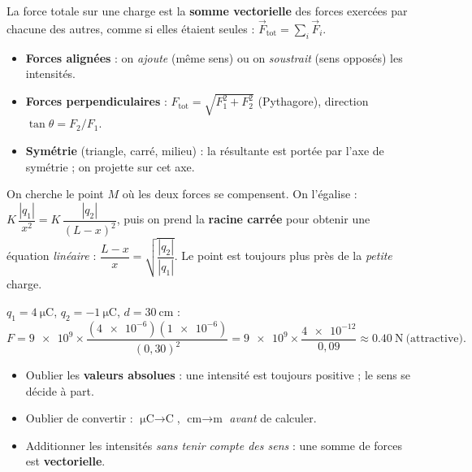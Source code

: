 \documentclass[11pt,a4paper]{article}
\newcommand{\vv}[1]{\vec{#1}}\newcommand{\ds}{\displaystyle}
\begin{document}
\begin{methode}
La force totale sur une charge est la \textbf{somme vectorielle} des forces exercées par chacune des
autres, comme si elles étaient seules :
$\vv{F}_{\text{tot}} = \sum_i \vv{F}_{i}$.
\begin{itemize}[leftmargin=1.5em,topsep=1pt,itemsep=1pt]
  \item \textbf{Forces alignées} : on \emph{ajoute} (même sens) ou on \emph{soustrait} (sens
        opposés) les intensités.
  \item \textbf{Forces perpendiculaires} : $F_{\text{tot}} = \sqrt{F_1^{2}+F_2^{2}}$ (Pythagore),
        direction $\tan\theta = F_2/F_1$.
  \item \textbf{Symétrie} (triangle, carré, milieu) : la résultante est portée par l'axe de
        symétrie ; on projette sur cet axe.
\end{itemize}
\end{methode}

\begin{methode}
On cherche le point $M$ où les deux forces se compensent. On l'égalise :
$K\,\dfrac{|q_1|}{x^2} = K\,\dfrac{|q_2|}{(L-x)^2}$, puis on prend la \textbf{racine carrée} pour
obtenir une équation \emph{linéaire} : $\dfrac{L-x}{x} = \sqrt{\dfrac{|q_2|}{|q_1|}}$. Le point est
toujours plus près de la \emph{petite} charge.
\end{methode}

\begin{exemplebox}
$q_1 = \SI{+4}{\micro\coulomb}$, $q_2 = \SI{-1}{\micro\coulomb}$, $d = \SI{30}{\centi\metre}$ :
\[ F = \num{9e9}\times\frac{(\num{4e-6})(\num{1e-6})}{(0{,}30)^2}
     = \num{9e9}\times\frac{\num{4e-12}}{0{,}09} \approx \SI{0.40}{\newton}\ \text{(attractive)}. \]
\end{exemplebox}

\begin{piege}
\begin{itemize}[leftmargin=1.5em,topsep=1pt,itemsep=1pt]
  \item Oublier les \textbf{valeurs absolues} : une intensité est toujours positive ; le sens se
        décide à part.
  \item Oublier de convertir : $\si{\micro\coulomb}\to\si{\coulomb}$, $\si{\centi\metre}\to\si{\metre}$
        \emph{avant} de calculer.
  \item Additionner les intensités \emph{sans tenir compte des sens} : une somme de forces est
        \textbf{vectorielle}.
\end{itemize}
\end{piege}
\end{document}
